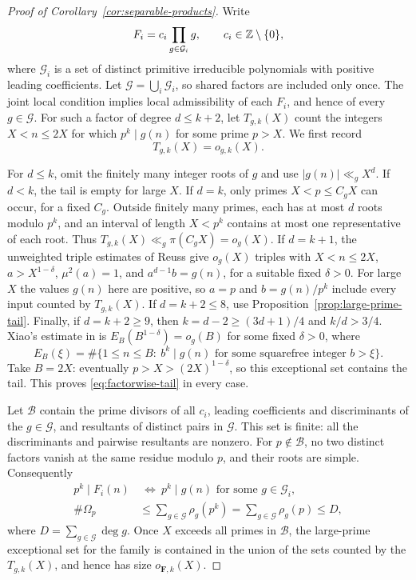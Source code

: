 \begin{proof}[Proof of Corollary~\ref{cor:separable-products}]
Write
\[
 F_i=c_i\prod_{g\in\mathcal G_i}g,\qquad c_i\in\mathbb Z\setminus\{0\},
\]
where $\mathcal G_i$ is a set of distinct primitive irreducible polynomials
with positive leading coefficients. Let $\mathcal G=\bigcup_i\mathcal G_i$,
so shared factors are included only once. The joint local condition implies
local admissibility of each $F_i$, and hence of every $g\in\mathcal G$.
For such a factor of degree $d\le k+2$, let $T_{g,k}(X)$ count the integers
$X<n\le2X$ for which $p^k\mid g(n)$ for some prime $p>X$. We first record
\begin{equation}
 T_{g,k}(X)=o_{g,k}(X).
 \label{eq:factorwise-tail}
\end{equation}

For $d\le k$, omit the finitely many integer roots of $g$ and use
$|g(n)|\ll_g X^d$. If $d<k$, the tail is empty for large $X$. If $d=k$,
only primes $X<p\le C_gX$ can occur, for a fixed $C_g$. Outside finitely
many primes, each has at most $d$ roots modulo $p^k$, and an interval of
length $X<p^k$ contains at most one representative of each root. Thus
$T_{g,k}(X)\ll_g\pi(C_gX)=o_g(X)$.
If $d=k+1$, the unweighted triple estimates of Reuss
\cite[Lemma~3 and its proof, and Section~6]{Reuss2015PowerFree} give
$o_g(X)$ triples with $X<n\le2X$, $a>X^{1-\delta}$, $\mu^2(a)=1$, and
$a^{d-1}b=g(n)$, for a suitable fixed $\delta>0$. For large $X$ the
values $g(n)$ here are positive, so $a=p$ and $b=g(n)/p^k$ include every
input counted by $T_{g,k}(X)$.
If $d=k+2\le8$, use Proposition~\ref{prop:large-prime-tail}.
Finally, if $d=k+2\ge9$, then $k=d-2\ge(3d+1)/4$ and $k/d>3/4$.
Xiao's estimate in \cite[Section~9]{Xiao2017PowerFree} is
$E_B(B^{1-\delta})=o_g(B)$ for some fixed $\delta>0$, where
\[
 E_B(\xi)=\#\{1\le n\le B:\ b^k\mid g(n)
                 \text{ for some squarefree integer }b>\xi\}.
\]
Take $B=2X$: eventually $p>X>(2X)^{1-\delta}$, so this exceptional set
contains the tail. This proves \eqref{eq:factorwise-tail} in every case.

Let $\mathcal B$ contain the prime divisors of all $c_i$, leading
coefficients and discriminants of the $g\in\mathcal G$, and resultants
of distinct pairs in $\mathcal G$. This set is finite: all the
discriminants and pairwise resultants are nonzero. For $p\notin\mathcal B$,
no two distinct factors vanish at the same residue modulo $p$, and their
roots are simple. Consequently
\[
 \begin{aligned}
 p^k\mid F_i(n)&\ \Longleftrightarrow\
 p^k\mid g(n)\text{ for some }g\in\mathcal G_i,\\
 \#\Omega_p&\le\sum_{g\in\mathcal G}\rho_g(p^k)
 =\sum_{g\in\mathcal G}\rho_g(p)\le D,
 \end{aligned}
\]
where $D=\sum_{g\in\mathcal G}\deg g$. Once $X$ exceeds all primes in
$\mathcal B$, the large-prime exceptional set for the family is contained
in the union of the sets counted by the $T_{g,k}(X)$, and hence has size
$o_{\mathbf F,k}(X)$.


\end{proof}

